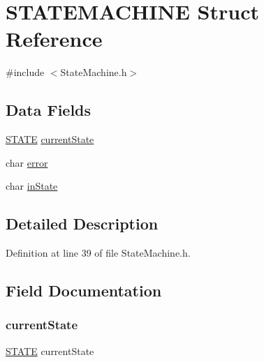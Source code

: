 \hypertarget{struct_s_t_a_t_e_m_a_c_h_i_n_e}{}\section{S\+T\+A\+T\+E\+M\+A\+C\+H\+I\+NE Struct Reference}
\label{struct_s_t_a_t_e_m_a_c_h_i_n_e}


{\ttfamily \#include $<$State\+Machine.\+h$>$}

\subsection*{Data Fields}
\begin{DoxyCompactItemize}
\item 
\hyperlink{_state_machine_8h_a275a67132f10277ada3a0ee3d616b647}{S\+T\+A\+TE} \hyperlink{struct_s_t_a_t_e_m_a_c_h_i_n_e_a175d1d31145856e5ca293a3a7c2795ee}{current\+State}
\item 
char \hyperlink{struct_s_t_a_t_e_m_a_c_h_i_n_e_a1b39a1a9b9888563c380903bcba6ecf4}{error}
\item 
char \hyperlink{struct_s_t_a_t_e_m_a_c_h_i_n_e_a3c3253f225f622698d3c4b407d0b262b}{in\+State}
\end{DoxyCompactItemize}


\subsection{Detailed Description}


Definition at line 39 of file State\+Machine.\+h.



\subsection{Field Documentation}
\mbox{\label{struct_s_t_a_t_e_m_a_c_h_i_n_e_a175d1d31145856e5ca293a3a7c2795ee}} 
\subsubsection{\texorpdfstring{current\+State}{currentState}}
{\footnotesize\ttfamily \hyperlink{_state_machine_8h_a275a67132f10277ada3a0ee3d616b647}{S\+T\+A\+TE} current\+State}



